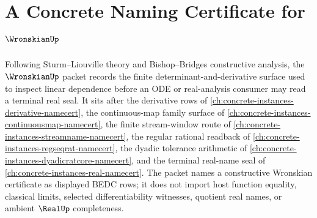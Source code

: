 \chapter{A Concrete Naming Certificate for $\WronskianUp$}
\label{ch:concrete-instances-wronskian-namecert}

Following Sturm--Liouville theory and Bishop--Bridges constructive analysis, the $\WronskianUp$ packet records the finite determinant-and-derivative surface used to inspect linear dependence before an ODE or real-analysis consumer may read a terminal real seal. It sits after the derivative rows of \autoref{ch:concrete-instances-derivative-namecert}, the continuous-map family surface of \autoref{ch:concrete-instances-continuousmap-namecert}, the finite stream-window route of \autoref{ch:concrete-instances-streamname-namecert}, the regular rational readback of \autoref{ch:concrete-instances-regseqrat-namecert}, the dyadic tolerance arithmetic of \autoref{ch:concrete-instances-dyadicratcore-namecert}, and the terminal real-name seal of \autoref{ch:concrete-instances-real-namecert}. The packet names a constructive Wronskian certificate as displayed BEDC rows; it does not import host function equality, classical limits, selected differentiability witnesses, quotient real names, or ambient $\RealUp$ completeness.



